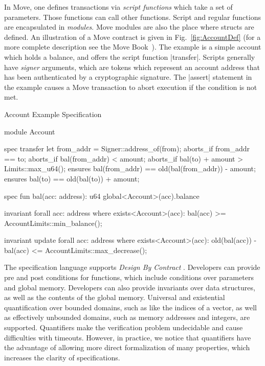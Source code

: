 \noindent In Move, one defines transactions via \emph{script functions}
which take a set of parameters.  Those functions can call other
functions. Script and regular functions are encapsulated in \emph{modules}. Move
modules are also the place where structs are defined. An illustration of a Move
contract is given in Fig.~\ref{fig:AccountDef} (for a more complete description
see the Move Book~\cite{MOVE_LANG}). The example is a simple account which
holds a balance, and offers the script function |transfer|.  Scripts generally
have \emph{signer} arguments, which are tokens which represent an account
address that has been authenticated by a cryptographic signature.  The |assert|
statement in the example causes a Move transaction to abort execution if the
condition is not met.



\begin{Figure}
\caption{\label{fig:AccountSpec} Account Example Specification}
\begin{MoveBox}
module Account {
  spec transfer {
    let from_addr = Signer::address_of(from);
    aborts_if from_addr == to;
    aborts_if bal(from_addr) < amount;
    aborts_if bal(to) + amount > Limits::max_u64();
    ensures bal(from_addr) == old(bal(from_addr)) - amount;
    ensures bal(to) == old(bal(to)) + amount;
  }

  spec fun bal(acc: address): u64 {
    global<Account>(acc).balance
  }

  invariant forall acc: address where exists<Account>(acc):
    bal(acc) >= AccountLimits::min_balance();

  invariant update forall acc: address where exists<Account>(acc):
    old(bal(acc)) - bal(acc) <= AccountLimits::max_decrease();
}
\end{MoveBox}
\end{Figure}

\noindent The specification language supports {\em Design By Contract}
\cite{DESIGN_BY_CONTRACT}. Developers can provide pre and post conditions for
functions, which include conditions over parameters and global
memory. Developers can also provide invariants over data structures, as well as
the contents of the global memory.  Universal and existential quantification
over bounded domains, such as like the indices of a vector, as well as
effectively unbounded domains, such as memory addresses and integers, are
supported.  Quantifiers make the verification problem undecidable and cause
difficulties with timeouts.  However, in practice, we notice that quantifiers
have the advantage of allowing more direct formalization of many properties,
which increases the clarity of specifications.

